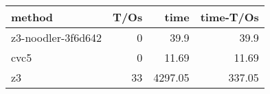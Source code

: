 \begin{tabular}{lrrr}
\hline
 method             &   T/Os &    time &   time-T/Os \\
\hline
 z3-noodler-3f6d642 &      0 &   39.9  &       39.9  \\
 cvc5               &      0 &   11.69 &       11.69 \\
 z3                 &     33 & 4297.05 &      337.05 \\
\hline
\end{tabular}
